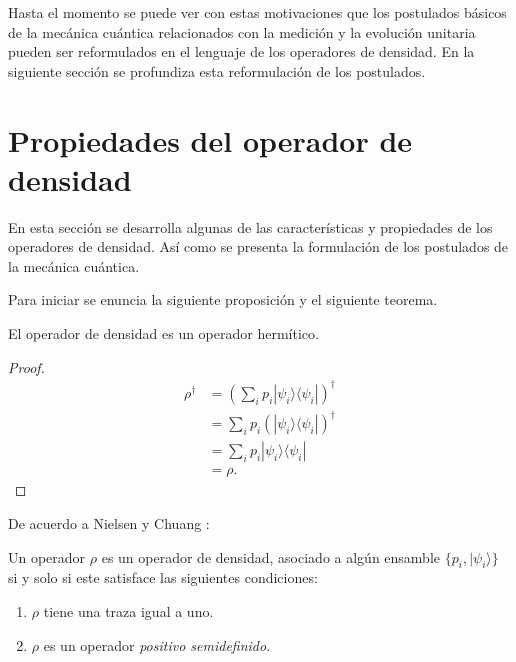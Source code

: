 Hasta el momento se puede ver con estas motivaciones que los postulados básicos de la mecánica cuántica relacionados con la medición y la evolución unitaria pueden ser reformulados en el lenguaje de los operadores de densidad. En la siguiente sección se profundiza esta reformulación de los postulados.


\section{Propiedades del operador de densidad}\label{postulates} %

En esta sección se desarrolla algunas de las características y propiedades de los operadores de densidad. Así como se presenta la formulación de los postulados de la mecánica cuántica. 

Para iniciar se enuncia la siguiente proposición y el siguiente teorema. 

\begin{proposition}El operador de densidad es un operador hermítico.
	
\end{proposition}


\begin{proof}
	\begin{equation}
		\begin{split}
			\rho^\dagger&={\left(\sum_{i} p_i|\psi_i\rangle \langle \psi_i|\right)}^{\dagger}\\
			&=\sum_{i} p_i {\left(|\psi_i\rangle \langle\psi_i|\right)}^{\dagger}\\
			&=\sum_{i} p_i |\psi_i\rangle \langle\psi_i|\\
			&=\rho.
		\end{split}
	\end{equation}
	
\end{proof}

De acuerdo a Nielsen y Chuang {\cite{nielsen_chuang_2010}}:\begin{theorem} Un operador $\rho$ es un operador de densidad, asociado a algún ensamble $\{p_i, |\psi_i\rangle\}$ si y solo si este satisface las siguientes condiciones:
\begin{enumerate}
	\item $\rho$ tiene una traza igual a uno.
	\item $\rho $ es un operador \textit{positivo semidefinido}.
\end{enumerate}	
\end{theorem}


